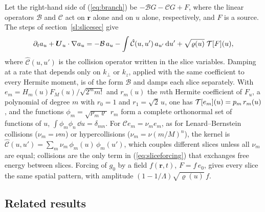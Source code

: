 Let the right-hand side of (\ref{eq:branch}) be $-\mathcal BG-\mathcal CG+F$, where the linear operators $\mathcal B$ and $\mathcal C$ act on $\boldsymbol r$ alone and on $u$ alone, respectively, and $F$ is a source. The steps of section~\ref{sl:slicesec} give
\begin{equation}\label{eq:sliceforcing}
  \partial_ta_u+\boldsymbol U_u\cdot\nabla a_u=-\mathcal B\,a_u-\int\hat{\mathcal C}(u,u')\,a_{u'}\,\mathrm{d} u'+\sqrt{\varrho(u)}\;\mathcal T[F](u),
\end{equation}
where $\hat{\mathcal C}(u,u')$ is the collision operator written in the slice variables. Damping at a rate that depends only on $k_\perp$ or $k_z$, applied with the same coefficient to every Hermite moment, is of the form $\mathcal B$ and damps each slice separately. With $e_m=H_m(u)F_M(u)/\sqrt{2^mm!}$ and $r_m(u)$ the $m$th Hermite coefficient of $F_u$, a polynomial of degree $m$ with $r_0=1$ and $r_1=\sqrt2\,u$, one has $\mathcal T[e_m](u)=p_m\,r_m(u)$, and the functions $\phi_m=\sqrt{p_m\varrho}\;r_m$ form a complete orthonormal set of functions of $u$, $\int\phi_m\phi_n\,\dd u=\delta_{mn}$. For $\mathcal Ce_m=\nu_me_m$, as for Lenard--Bernstein collisions ($\nu_m=\nu m$) or hypercollisions ($\nu_m=\nu(m/M)^n$), the kernel is $\hat{\mathcal C}(u,u')=\sum_m\nu_m\,\phi_m(u)\,\phi_m(u')$, which couples different slices unless all $\nu_m$ are equal; collisions are the only term in (\ref{eq:sliceforcing}) that exchanges free energy between slices. Forcing of $g_0$ by a field $f(\boldsymbol r,t)$, $F=f\,e_0$, gives every slice the same spatial pattern, with amplitude $(1-1/\Lambda)\sqrt{\varrho(u)}\,f$.

\subsection{Related results}\label{sl:remlit}

